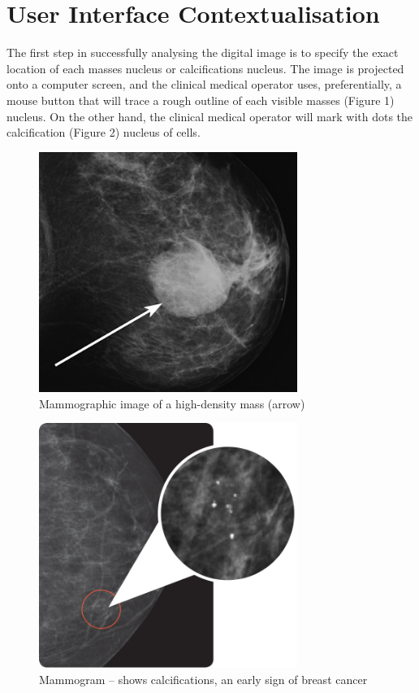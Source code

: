 \section{User Interface Contextualisation}

The first step in successfully analysing the digital image is to specify the exact location of each masses nucleus or calcifications nucleus. The image is projected onto a computer screen, and the clinical medical operator uses, preferentially, a mouse button that will trace a rough outline of each visible masses (Figure 1) nucleus. On the other hand, the clinical medical operator will mark with dots the calcification (Figure 2) nucleus of cells.

\begin{figure}[!hbt]
\centering
\includegraphics[width=0.75\textwidth]{masses.png}
\caption{\label{fig:frog}Mammographic image of a high-density mass (arrow)
}
\end{figure}

\begin{figure}[!hbt]
\centering
\includegraphics[width=0.75\textwidth]{calcifications.png}
\caption{\label{fig:frog}Mammogram – shows calcifications, an early sign of breast cancer
}
\end{figure}

